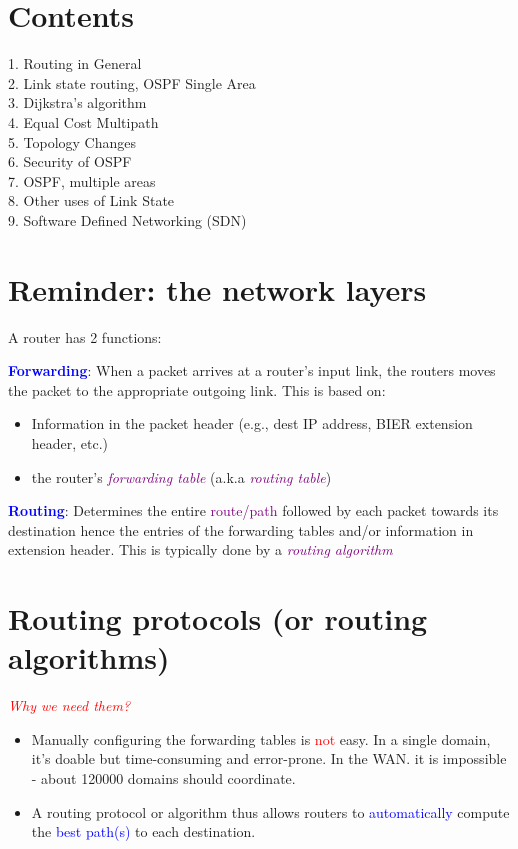 \documentclass[11pt]{article}
\begin{document}
\vspace{1cm}

\section*{Contents}

1. Routing in General \\
2. Link state routing, OSPF Single Area \\
3. Dijkstra's algorithm \\
4. Equal Cost Multipath \\
5. Topology Changes \\
6. Security of OSPF \\
7. OSPF, multiple areas \\
8. Other uses of Link State \\
9. Software Defined Networking (SDN)

\section*{Reminder: the network layers}

A router has 2 functions:

\textbf{\textcolor{blue}{Forwarding}}: When a packet arrives at a router's input link, the routers moves the packet to the appropriate outgoing link. This is based on: 
\begin{itemize}
	\item Information in the packet header (e.g., dest IP address, BIER extension header, etc.)
	\item the router's \textcolor{purple}{\textit{forwarding table}} (a.k.a \textcolor{purple}{\textit{routing table}})
\end{itemize}

\textcolor{blue}{\textbf{Routing}}: Determines the entire \textcolor{purple}{route/path} followed by each packet towards its destination hence the entries of the forwarding tables and/or information in extension header. This is typically done by a \textit{\textcolor{purple}{routing algorithm}}

\section*{Routing protocols (or routing algorithms)}

\textcolor{red}{\textit{Why we need them?}}
\begin{itemize}
	\item Manually configuring the forwarding tables is \textcolor{red}{not} easy. In a single domain, it's doable but time-consuming and error-prone. In the WAN. it is impossible - about 120000 domains should coordinate. 
	\item A routing protocol or algorithm thus allows routers to \textcolor{blue}{automatically} compute the \textcolor{blue}{best path(s)} to each destination.
\end{itemize}
\end{document}
